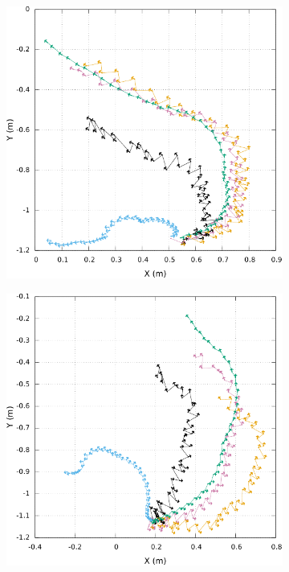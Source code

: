 \begin{figure}[htbp]
\begin{subfigure}{0.29\paperwidth}
    \end{subfigure}
    \begin{subfigure}{0.29\paperwidth}
        \centering
        \includegraphics[type=pdf,ext=.pdf,read=.pdf,width=1.0\linewidth]{../plot/OdometryLWPR/grass_open_traj4_pose}
    \end{subfigure}
    \newline
    \begin{subfigure}{0.29\paperwidth}
        \centering
        \includegraphics[type=pdf,ext=.pdf,read=.pdf,width=1.0\linewidth]{../plot/OdometryLWPR/grass_open_traj5_pose}

\end{subfigure}
\end{figure}
